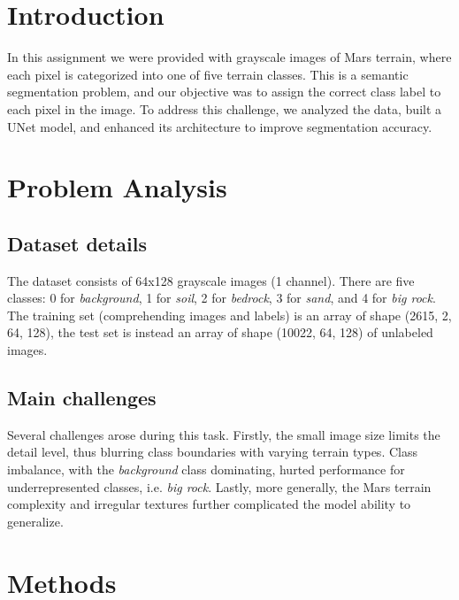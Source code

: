 \documentclass[11pt]{article}
\begin{document}
    \begin{multicols}{2}
        
        \section{Introduction}
        
        In this assignment\cite{lecun2015deep}\cite{polimi_2024_2025} we were provided with grayscale images of Mars terrain, where each pixel is categorized into one of five terrain classes.
        This is a semantic segmentation problem, and our objective was to assign the correct class label to each pixel in the image. 
        To address this challenge, we analyzed the data, built a UNet model, and enhanced its architecture to improve segmentation accuracy.

        \section{Problem Analysis}

        \subsection{Dataset details}
        
        The dataset consists of 64x128 grayscale images (1 channel).
        There are five classes: 0 for \textit{background}, 1 for \textit{soil}, 2 for \textit{bedrock}, 3 for \textit{sand}, and 4 for \textit{big rock}.
        The training set (comprehending images and labels) is an array of shape (2615, 2, 64, 128), the test set is instead an array of shape (10022, 64, 128) of unlabeled images.
        
        \subsection{Main challenges}
        
        Several challenges arose during this task.
        Firstly, the small image size limits the detail level, thus blurring class boundaries with varying terrain types.
        Class imbalance, with the \textit{background} class dominating, hurted performance for underrepresented classes, i.e. \textit{big rock}. 
        Lastly, more generally, the Mars terrain complexity and irregular textures further complicated the model ability to generalize.
        
        \section{Methods}


\end{multicols}
\end{document}
